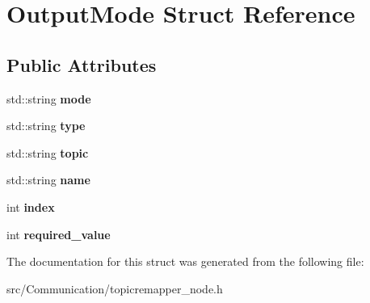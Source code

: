 \hypertarget{structOutputMode}{}\section{Output\+Mode Struct Reference}
\label{structOutputMode}
\subsection*{Public Attributes}
\begin{DoxyCompactItemize}
\item 
\mbox{\label{structOutputMode_a58835c45645b177fb7677b03fc44cfcf}} 
std\+::string {\bfseries mode}
\item 
\mbox{\label{structOutputMode_ad4f6112a52ff69d0b386683b94efec29}} 
std\+::string {\bfseries type}
\item 
\mbox{\label{structOutputMode_a9da2c67e20b8ea204c9290878107a11c}} 
std\+::string {\bfseries topic}
\item 
\mbox{\label{structOutputMode_a8e185d024bb51eeb18963120b5c4b15a}} 
std\+::string {\bfseries name}
\item 
\mbox{\label{structOutputMode_a2a19444bba2c6efc5bd9c1684525d33e}} 
int {\bfseries index}
\item 
\mbox{\label{structOutputMode_a1ee92b6a5441150ced699e7d2eaac823}} 
int {\bfseries required\+\_\+value}
\end{DoxyCompactItemize}


The documentation for this struct was generated from the following file\+:\begin{DoxyCompactItemize}
\item 
src/\+Communication/topicremapper\+\_\+node.\+h\end{DoxyCompactItemize}
